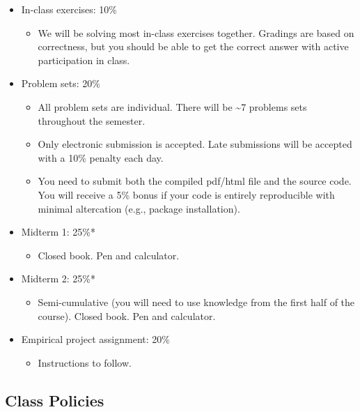\documentclass[
]{article}
\providecommand{\tightlist}{%
  \setlength{\itemsep}{0pt}\setlength{\parskip}{0pt}}
\begin{document}
\begin{itemize}
\tightlist
\item
  In-class exercises: 10\%

  \begin{itemize}
  \tightlist
  \item
    We will be solving most in-class exercises together. Gradings are
    based on correctness, but you should be able to get the correct
    answer with active participation in class.
  \end{itemize}
\item
  Problem sets: 20\%

  \begin{itemize}
  \tightlist
  \item
    All problem sets are individual. There will be \textasciitilde7
    problems sets throughout the semester.
  \item
    Only electronic submission is accepted. Late submissions will be
    accepted with a 10\% penalty each day.
  \item
    You need to submit both the compiled pdf/html file and the source
    code. You will receive a 5\% bonus if your code is entirely
    reproducible with minimal altercation (e.g., package installation).
  \end{itemize}
\item
  Midterm 1: 25\%*

  \begin{itemize}
  \tightlist
  \item
    Closed book. Pen and calculator.
  \end{itemize}
\item
  Midterm 2: 25\%*

  \begin{itemize}
  \tightlist
  \item
    Semi-cumulative (you will need to use knowledge from the first half
    of the course). Closed book. Pen and calculator.
  \end{itemize}
\item
  Empirical project assignment: 20\%

  \begin{itemize}
  \tightlist
  \item
    Instructions to follow.
  \end{itemize}
\end{itemize}

\hypertarget{class-policies}{%
\subsection{Class Policies}\label{class-policies}}
\end{document}
